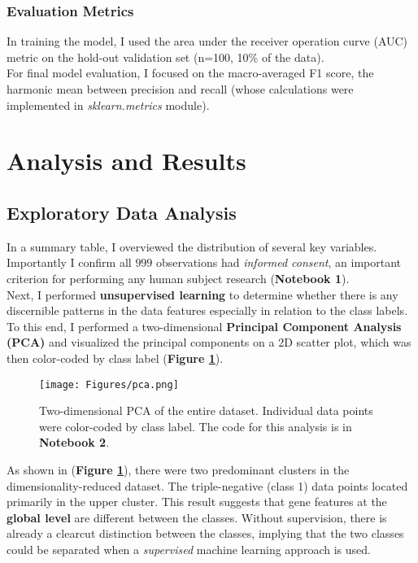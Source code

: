 \documentclass[11pt]{diazessay}
\begin{document}
\subsubsection{Evaluation Metrics}

In training the model, I used the area under the receiver operation curve (AUC) metric on the hold-out validation set (n=100, 10\% of the data). \\

For final model evaluation, I focused on the macro-averaged F1 score, the harmonic mean between precision and recall (whose calculations were implemented in \textit{sklearn.metrics} module). 


\section{Analysis and Results}

\subsection{Exploratory Data Analysis}

In a summary table, I overviewed the distribution of several key variables. Importantly I confirm all $999$ observations had \textit{informed consent}, an important criterion for performing any human subject research (\textbf{Notebook 1}). \\

Next, I performed \textbf{unsupervised learning} to determine whether there is any discernible patterns in the data features especially in relation to the class labels. To this end, I performed a two-dimensional \textbf{Principal Component Analysis (PCA)} and visualized the principal components on a 2D scatter plot, which was then color-coded by class label (\textbf{Figure \ref{fig:pca}}).

\begin{figure}[h]
	\centering
	\caption{Two-dimensional PCA of the entire dataset. Individual data points were color-coded by class label. The code for this analysis is in \textbf{Notebook 2}. }
	\label{fig:pca}
	\texttt{[image: Figures/pca.png]}
\end{figure}

As shown in (\textbf{Figure \ref{fig:pca}}), there were two predominant clusters in the dimensionality-reduced dataset. The triple-negative (class 1) data points located primarily in the upper cluster. This result suggests that gene features at the \textbf{global level} are different between the classes. Without supervision, there is already a clearcut distinction between the classes, implying that the two classes could be separated when a \textit{supervised} machine learning approach is used.
\end{document}

